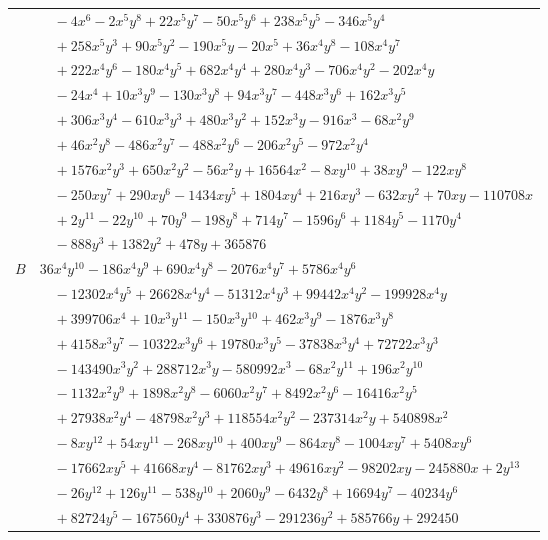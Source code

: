 \documentclass[11pt]{article}
\begin{document}
\begin{longtable}{@{}ll@{}}
 & $\quad -4x^{6}-2x^{5}y^{8}+22x^{5}y^{7}-50x^{5}y^{6}+238x^{5}y^{5}-346x^{5}y^{4}$\\
 & $\quad +258x^{5}y^{3}+90x^{5}y^{2}-190x^{5}y-20x^{5}+36x^{4}y^{8}-108x^{4}y^{7}$\\
 & $\quad +222x^{4}y^{6}-180x^{4}y^{5}+682x^{4}y^{4}+280x^{4}y^{3}-706x^{4}y^{2}-202x^{4}y$\\
 & $\quad -24x^{4}+10x^{3}y^{9}-130x^{3}y^{8}+94x^{3}y^{7}-448x^{3}y^{6}+162x^{3}y^{5}$\\
 & $\quad +306x^{3}y^{4}-610x^{3}y^{3}+480x^{3}y^{2}+152x^{3}y-916x^{3}-68x^{2}y^{9}$\\
 & $\quad +46x^{2}y^{8}-486x^{2}y^{7}-488x^{2}y^{6}-206x^{2}y^{5}-972x^{2}y^{4}$\\
 & $\quad +1576x^{2}y^{3}+650x^{2}y^{2}-56x^{2}y+16564x^{2}-8xy^{10}+38xy^{9}-122xy^{8}$\\
 & $\quad -250xy^{7}+290xy^{6}-1434xy^{5}+1804xy^{4}+216xy^{3}-632xy^{2}+70xy-110708x$\\
 & $\quad +2y^{11}-22y^{10}+70y^{9}-198y^{8}+714y^{7}-1596y^{6}+1184y^{5}-1170y^{4}$\\
 & $\quad -888y^{3}+1382y^{2}+478y+365876$\\
$B$ & $36x^{4}y^{10}-186x^{4}y^{9}+690x^{4}y^{8}-2076x^{4}y^{7}+5786x^{4}y^{6}$\\
 & $\quad -12302x^{4}y^{5}+26628x^{4}y^{4}-51312x^{4}y^{3}+99442x^{4}y^{2}-199928x^{4}y$\\
 & $\quad +399706x^{4}+10x^{3}y^{11}-150x^{3}y^{10}+462x^{3}y^{9}-1876x^{3}y^{8}$\\
 & $\quad +4158x^{3}y^{7}-10322x^{3}y^{6}+19780x^{3}y^{5}-37838x^{3}y^{4}+72722x^{3}y^{3}$\\
 & $\quad -143490x^{3}y^{2}+288712x^{3}y-580992x^{3}-68x^{2}y^{11}+196x^{2}y^{10}$\\
 & $\quad -1132x^{2}y^{9}+1898x^{2}y^{8}-6060x^{2}y^{7}+8492x^{2}y^{6}-16416x^{2}y^{5}$\\
 & $\quad +27938x^{2}y^{4}-48798x^{2}y^{3}+118554x^{2}y^{2}-237314x^{2}y+540898x^{2}$\\
 & $\quad -8xy^{12}+54xy^{11}-268xy^{10}+400xy^{9}-864xy^{8}-1004xy^{7}+5408xy^{6}$\\
 & $\quad -17662xy^{5}+41668xy^{4}-81762xy^{3}+49616xy^{2}-98202xy-245880x+2y^{13}$\\
 & $\quad -26y^{12}+126y^{11}-538y^{10}+2060y^{9}-6432y^{8}+16694y^{7}-40234y^{6}$\\
 & $\quad +82724y^{5}-167560y^{4}+330876y^{3}-291236y^{2}+585766y+292450$\\

\end{longtable}
\end{document}
